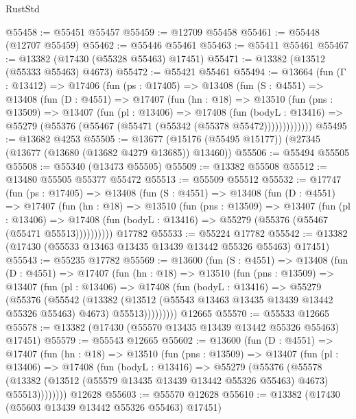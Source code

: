 \begin{lexlean}{RustStd}
\begin{coremodule}
@55458 := @55451 @55457
@55459 := @12709 @55458
@55461 := @55448 (@12707 @55459)
@55462 := @55446 @55461
@55463 := @55411 @55461
@55467 := @13382 (@17430 (@55328 @55463) @17451)
@55471 := @13382 (@13512 (@55333 @55463) @4673)
@55472 := @55421 @55461
@55494 := @13664
    (fun (Γ : @13412) =>
    @17406
      (fun (ps : @17405) =>
      @13408
        (fun (S : @4551) =>
        @13408
          (fun (D : @4551) =>
          @17407
            (fun (hn : @18) =>
            @13510
              (fun (pns : @13509) =>
              @13407
                (fun (pl : @13406) =>
                @17408
                  (fun (bodyL : @13416) =>
                  @55279 (@55376 (@55467 (@55471 (@55342 (@55378 @55472)))))))))))))
@55495 := @13682 @4253
@55505 := @13677 (@15176 (@55495 @15177)) (@27345 (@13677 (@13680 (@13682 @4279 @13685)) @13460))
@55506 := @55494 @55505
@55508 := @55340 (@13473 @55505)
@55509 := @13382 @55508
@55512 := @13480 @55505 @55377 @55472
@55513 := @55509 @55512
@55532 := @17747
    (fun (ps : @17405) =>
    @13408
      (fun (S : @4551) =>
      @13408
        (fun (D : @4551) =>
        @17407
          (fun (hn : @18) =>
          @13510
            (fun (pns : @13509) =>
            @13407
              (fun (pl : @13406) =>
              @17408 (fun (bodyL : @13416) => @55279 (@55376 (@55467 (@55471 @55513))))))))))
    @17782
@55533 := @55224 @17782
@55542 := @13382 (@17430 (@55533 @13463 @13435 @13439 @13442 @55326 @55463) @17451)
@55543 := @55235 @17782
@55569 := @13600
    (fun (S : @4551) =>
    @13408
      (fun (D : @4551) =>
      @17407
        (fun (hn : @18) =>
        @13510
          (fun (pns : @13509) =>
          @13407
            (fun (pl : @13406) =>
            @17408
              (fun (bodyL : @13416) =>
              @55279
                (@55376
                  (@55542
                    (@13382
                      (@13512 (@55543 @13463 @13435 @13439 @13442 @55326 @55463) @4673)
                      @55513)))))))))
    @12665
@55570 := @55533 @12665
@55578 := @13382 (@17430 (@55570 @13435 @13439 @13442 @55326 @55463) @17451)
@55579 := @55543 @12665
@55602 := @13600
    (fun (D : @4551) =>
    @17407
      (fun (hn : @18) =>
      @13510
        (fun (pns : @13509) =>
        @13407
          (fun (pl : @13406) =>
          @17408
            (fun (bodyL : @13416) =>
            @55279
              (@55376
                (@55578
                  (@13382 (@13512 (@55579 @13435 @13439 @13442 @55326 @55463) @4673) @55513))))))))
    @12628
@55603 := @55570 @12628
@55610 := @13382 (@17430 (@55603 @13439 @13442 @55326 @55463) @17451)

\end{coremodule}
\end{lexlean}
